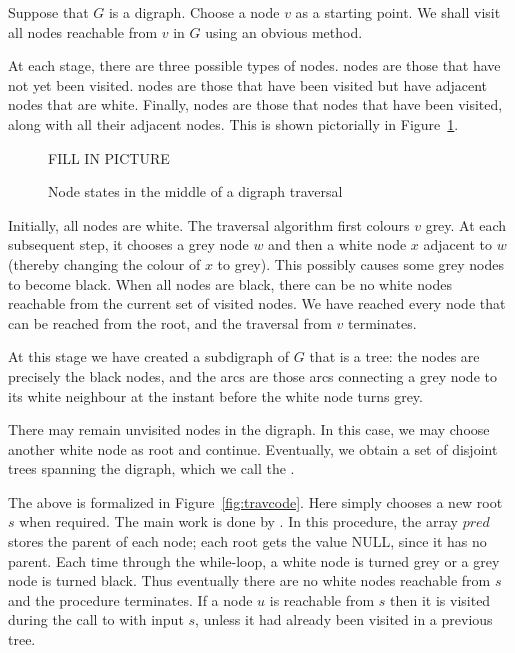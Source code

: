 Suppose that $G$ is a digraph. Choose a node $v$ as a starting point. We
shall visit all nodes reachable from $v$ in $G$ using an obvious method.

At each stage, there are three possible types of nodes. 
nodes are those that have not yet been visited.  nodes
are those that have been visited but have adjacent nodes that are white.
Finally,  nodes are those that nodes that have been
visited, along with all their adjacent nodes. This is shown pictorially in Figure~\ref{fig:travcols}. 

\begin{figure}

FILL IN PICTURE

\caption{Node states in the middle of a digraph traversal}
\label{fig:travcols}

\end{figure}


Initially, all nodes are white. The traversal algorithm first colours
$v$ grey. At each subsequent step, it chooses a grey node $w$ and then a
white node $x$  adjacent to $w$ (thereby changing the colour of $x$ to
grey). This possibly causes some grey nodes to become black. When all
nodes are black, there can be no white nodes reachable from the current
set of visited nodes. We have reached every node that can be reached
from the root, and the traversal from $v$ terminates. 

At this stage we have created a subdigraph of $G$ that is a tree: the
nodes are precisely the black nodes, and the arcs are those arcs
connecting a grey node to its white neighbour at the instant before the
white node turns grey.

There may remain unvisited nodes in the digraph. In this case, we may
choose another white node as root and continue. Eventually, we obtain a
set of disjoint trees spanning the digraph, which we call the
. 

The above is formalized in Figure~\ref{fig:travcode}. Here  simply chooses a new root $s$ when required. The main work is done by . In this procedure, the array $pred$ stores the parent of each node; each root gets the value NULL, since it has no parent. Each time through the while-loop, a white node is turned grey or a grey node is turned black. Thus eventually there are no white nodes reachable from $s$ and the procedure terminates. If a node $u$ is reachable from $s$ then it is visited during the call to  with input $s$, unless it had already been visited in a previous tree.

